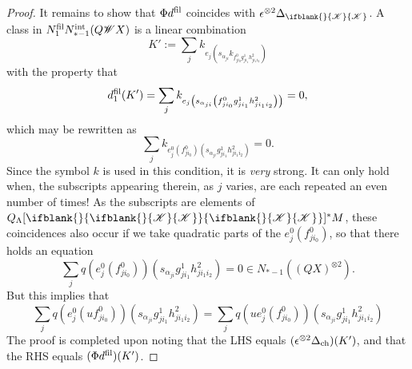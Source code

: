 \documentclass[10pt]{article}
\newcommand{\LL}[1]{\ifblank{#1}{\scrK}{\scrK^{#1}}}
\newcommand{\Fr}[2][]{\ifblank{#1}{#2}{#2_{#1}}}
\begin{document}
\begin{backgroundOnMultiplicativity}
\begin{proof}
It remains to show that $\Phi\circ d^\textup{fil}$ coincides with $\epsilon^{\otimes 2}\circ\Delta_{\LL{}}$. A class in $N_1^\textup{fil}N_{*-1}^\textup{int}(Q\scrW X)$ is a linear combination
\[K':=\sum_j k_{e_j\left(s_{\alpha_{ji}}k_{f^0_{ji_0}g^1_{ji_1}h^2_{ji_1i_2}}\right)}\]
with the property that
\[d_1^\textup{fil}(K')=\sum_j k_{e_j\left(s_{\alpha_{ji}}\left( f^0_{ji_0}g^1_{ji_1}h^2_{ji_1i_2}\right)\right)}=0,\]
which may be rewritten as
\[\sum_j k_{e^0_j(f^0_{ji_0})\left(s_{\alpha_{ji}} g^1_{ji_1}h^2_{ji_1i_2}\right)}=0.\]
Since the symbol $k$ is used in this condition, it is \emph{very} strong. It can only hold when, the subscripts appearing therein, as $j$ varies, are each repeated an even number of times! As the subscripts are elements of $Q_{\Lambda}[\Fr{\LL{}}]^{*}M$, these coincidences also occur if we take quadratic parts of the $e^0_j(f^0_{ji_0})$, so that there holds an equation
\[\sum_j {q(e^0_j(f^0_{ji_0}))\left(s_{\alpha_{ji}} g^1_{ji_1}h^2_{ji_1i_2}\right)}=0\in N_{*-1}((QX)^{\otimes2}).\]
But this implies that
\[\sum_j {q(e^0_j(uf^0_{ji_0}))\left(s_{\alpha_{ji}} g^1_{ji_1}h^2_{ji_1i_2}\right)}=\sum_j {q(ue^0_j(f^0_{ji_0}))\left(s_{\alpha_{ji}} g^1_{ji_1}h^2_{ji_1i_2}\right)}\]
The proof is completed upon noting that the LHS equals $(\epsilon^{\otimes 2}\circ \Delta_\textup{ch})(K')$, and that the RHS equals $(\Phi\circ d^\textup{fil})(K')$.
\end{proof}
\end{backgroundOnMultiplicativity}
\end{document}
